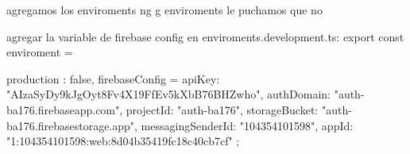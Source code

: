 
agregamos los enviroments
ng g enviroments
le puchamos que no

agregar la variable de firebase config en enviroments.development.ts:
export const enviroment = {
    production : false,
    firebaseConfig = {
  apiKey: "AIzaSyDy9kJgOyt8Fv4X19FfEv5kXbB76BHZwho",
  authDomain: "auth-ba176.firebaseapp.com",
  projectId: "auth-ba176",
  storageBucket: "auth-ba176.firebasestorage.app",
  messagingSenderId: "104354101598",
  appId: "1:104354101598:web:8d04b35419fc18c40cb7cf"
};

}



